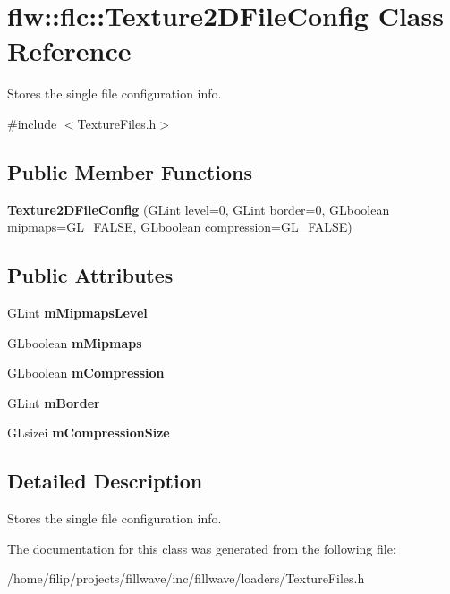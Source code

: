\hypertarget{classflw_1_1flc_1_1Texture2DFileConfig}{}\section{flw\+:\+:flc\+:\+:Texture2\+D\+File\+Config Class Reference}
\label{classflw_1_1flc_1_1Texture2DFileConfig}


Stores the single file configuration info.  




{\ttfamily \#include $<$Texture\+Files.\+h$>$}

\subsection*{Public Member Functions}
\begin{DoxyCompactItemize}
\item 
\mbox{\label{classflw_1_1flc_1_1Texture2DFileConfig_a9460ffd6c886e47eb9a4cf208f80f347}} 
{\bfseries Texture2\+D\+File\+Config} (G\+Lint level=0, G\+Lint border=0, G\+Lboolean mipmaps=G\+L\+\_\+\+F\+A\+L\+SE, G\+Lboolean compression=G\+L\+\_\+\+F\+A\+L\+SE)
\end{DoxyCompactItemize}
\subsection*{Public Attributes}
\begin{DoxyCompactItemize}
\item 
\mbox{\label{classflw_1_1flc_1_1Texture2DFileConfig_a6c1e5d6eca403cec9a761cc726660e37}} 
G\+Lint {\bfseries m\+Mipmaps\+Level}
\item 
\mbox{\label{classflw_1_1flc_1_1Texture2DFileConfig_a52f1cfb2f1c0ebe03cb58a169e77b2da}} 
G\+Lboolean {\bfseries m\+Mipmaps}
\item 
\mbox{\label{classflw_1_1flc_1_1Texture2DFileConfig_a8d344c9e3b39c34d6e972ea707d4fc7c}} 
G\+Lboolean {\bfseries m\+Compression}
\item 
\mbox{\label{classflw_1_1flc_1_1Texture2DFileConfig_aed975fce43ed5c8b7c5ef427478fb20d}} 
G\+Lint {\bfseries m\+Border}
\item 
\mbox{\label{classflw_1_1flc_1_1Texture2DFileConfig_aea9d6ddc99455e9de6d60b4f55af6ce5}} 
G\+Lsizei {\bfseries m\+Compression\+Size}
\end{DoxyCompactItemize}


\subsection{Detailed Description}
Stores the single file configuration info. 

The documentation for this class was generated from the following file\+:\begin{DoxyCompactItemize}
\item 
/home/filip/projects/fillwave/inc/fillwave/loaders/Texture\+Files.\+h\end{DoxyCompactItemize}
